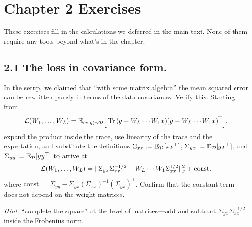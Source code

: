 \section*{Chapter 2 Exercises}

These exercises fill in the calculations we deferred in the main text. None of
them require any tools beyond what's in the chapter.

\subsection*{2.1 The loss in covariance form.}
In the setup, we claimed that ``with some matrix algebra'' the mean squared error
can be rewritten purely in terms of the data covariances. Verify this. Starting
from
\begin{align*}
    \mathcal{L}(W_1, \dots, W_L)
    = \mathbb{E}_{(x,y)\sim\mathcal{D}}
      \Big[\Tr\,(y - W_L \cdots W_1 x)(y - W_L \cdots W_1 x)^\top \Big],
\end{align*}
expand the product inside the trace, use linearity of the trace and the
expectation, and substitute the definitions $\Sigma_{xx} := \mathbb{E}_{\mathcal{D}}[xx^\top]$,
$\Sigma_{yx} := \mathbb{E}_{\mathcal{D}}[yx^\top]$, and $\Sigma_{yy} := \mathbb{E}_{\mathcal{D}}[yy^\top]$
to arrive at
\begin{align*}
    \mathcal{L}(W_1, \dots, W_L)
    = \|\Sigma_{yx}\Sigma_{xx}^{-1/2} - W_L \cdots W_1 \Sigma_{xx}^{1/2}\|_\mathrm{F}^2
      + \mathrm{const.}
\end{align*}
where $\mathrm{const.} = \Sigma_{yy} - \Sigma_{yx}(\Sigma_{xx})^{-1}(\Sigma_{yx})^\top$.
Confirm that the constant term does not depend on the weight matrices.

\emph{Hint:} ``complete the square'' at the level of matrices---add and subtract
$\Sigma_{yx}\Sigma_{xx}^{-1/2}$ inside the Frobenius norm.

